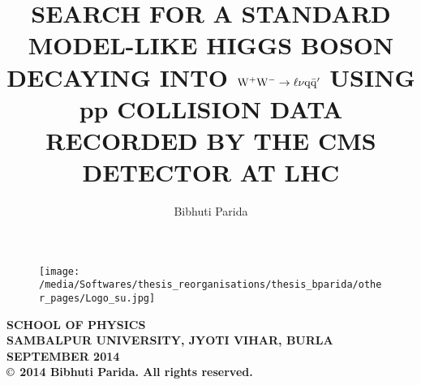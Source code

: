 \begin{singlespacing}
%
%
\title{SEARCH FOR A STANDARD MODEL-LIKE HIGGS BOSON DECAYING INTO  $\rm {W^{+}W^{-}\rightarrow \ell\nu q\bar q^{\prime}}$ USING pp COLLISION DATA RECORDED BY THE CMS DETECTOR AT LHC}
%
%
\author{Bibhuti Parida}
\maketitle
\vspace{.1cm}
\begin{figure}[h]
\centering
\texttt{[image: /media/Softwares/thesis\_reorganisations/thesis\_bparida/other\_pages/Logo\_su.jpg]}
\end{figure}
\begin{center}
{\large {\bf SCHOOL OF PHYSICS}}\\
\vspace{.12cm}
{\large {\bf SAMBALPUR UNIVERSITY, JYOTI VIHAR, BURLA}}\\
\vspace{.12cm}
{\large {\bf SEPTEMBER 2014}}\\
\vspace{.22cm}
{\bf $\copyright$ 2014 Bibhuti Parida. All rights reserved.}

\end{center}

\end{singlespacing}

